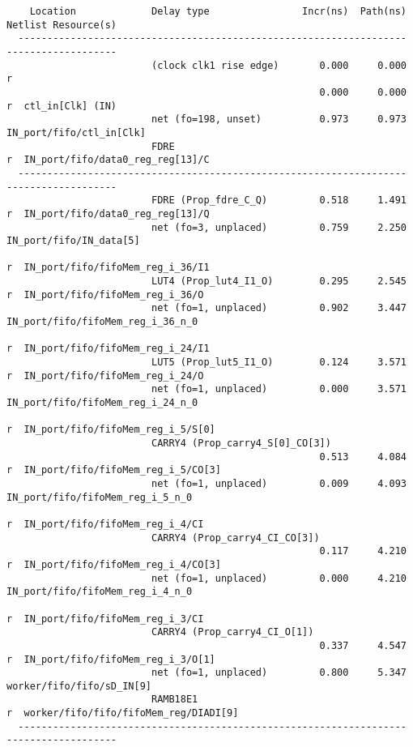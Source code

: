 \documentclass{article}
\begin{document}
\begin{lstlisting}
    Location             Delay type                Incr(ns)  Path(ns)    Netlist Resource(s)
  -------------------------------------------------------------------    -------------------
                         (clock clk1 rise edge)       0.000     0.000 r
                                                      0.000     0.000 r  ctl_in[Clk] (IN)
                         net (fo=198, unset)          0.973     0.973    IN_port/fifo/ctl_in[Clk]
                         FDRE                                         r  IN_port/fifo/data0_reg_reg[13]/C
  -------------------------------------------------------------------    -------------------
                         FDRE (Prop_fdre_C_Q)         0.518     1.491 r  IN_port/fifo/data0_reg_reg[13]/Q
                         net (fo=3, unplaced)         0.759     2.250    IN_port/fifo/IN_data[5]
                                                                      r  IN_port/fifo/fifoMem_reg_i_36/I1
                         LUT4 (Prop_lut4_I1_O)        0.295     2.545 r  IN_port/fifo/fifoMem_reg_i_36/O
                         net (fo=1, unplaced)         0.902     3.447    IN_port/fifo/fifoMem_reg_i_36_n_0
                                                                      r  IN_port/fifo/fifoMem_reg_i_24/I1
                         LUT5 (Prop_lut5_I1_O)        0.124     3.571 r  IN_port/fifo/fifoMem_reg_i_24/O
                         net (fo=1, unplaced)         0.000     3.571    IN_port/fifo/fifoMem_reg_i_24_n_0
                                                                      r  IN_port/fifo/fifoMem_reg_i_5/S[0]
                         CARRY4 (Prop_carry4_S[0]_CO[3])
                                                      0.513     4.084 r  IN_port/fifo/fifoMem_reg_i_5/CO[3]
                         net (fo=1, unplaced)         0.009     4.093    IN_port/fifo/fifoMem_reg_i_5_n_0
                                                                      r  IN_port/fifo/fifoMem_reg_i_4/CI
                         CARRY4 (Prop_carry4_CI_CO[3])
                                                      0.117     4.210 r  IN_port/fifo/fifoMem_reg_i_4/CO[3]
                         net (fo=1, unplaced)         0.000     4.210    IN_port/fifo/fifoMem_reg_i_4_n_0
                                                                      r  IN_port/fifo/fifoMem_reg_i_3/CI
                         CARRY4 (Prop_carry4_CI_O[1])
                                                      0.337     4.547 r  IN_port/fifo/fifoMem_reg_i_3/O[1]
                         net (fo=1, unplaced)         0.800     5.347    worker/fifo/fifo/sD_IN[9]
                         RAMB18E1                                     r  worker/fifo/fifo/fifoMem_reg/DIADI[9]
  -------------------------------------------------------------------    -------------------


\end{lstlisting}
\end{document}
